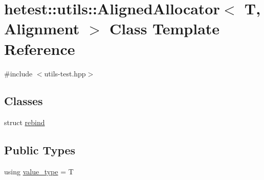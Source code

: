 \hypertarget{classhetest_1_1utils_1_1AlignedAllocator}{\section{hetest\-:\-:utils\-:\-:Aligned\-Allocator$<$ T, Alignment $>$ Class Template Reference}
\label{classhetest_1_1utils_1_1AlignedAllocator}
}


{\ttfamily \#include $<$utils-\/test.\-hpp$>$}

\subsection*{Classes}
\begin{DoxyCompactItemize}
\item 
struct \hyperlink{structhetest_1_1utils_1_1AlignedAllocator_1_1rebind}{rebind}
\end{DoxyCompactItemize}
\subsection*{Public Types}
\begin{DoxyCompactItemize}
\item 
using \hyperlink{classhetest_1_1utils_1_1AlignedAllocator_a1de3067f7171cca11e5c3cd10b508998}{value\-\_\-type} = T
\end{DoxyCompactItemize}
